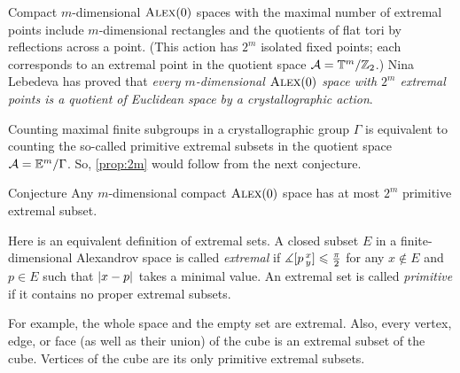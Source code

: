Compact $m$-dimensional $\textsc{Alex}(0)$ spaces with the maximal number of extremal points include $m$-dimensional rectangles and the quotients of flat tori by reflections across a point.
(This action has $2^m$ isolated fixed points; each corresponds to an extremal point in the quotient space $\mathcal{A}=\mathbb{T}^m/\mathbb{Z}_2$.)
Nina Lebedeva has proved \cite{lebedeva} that \textit{every $m$-dimensional $\textsc{Alex}(0)$ space with $2^m$ extremal points is a quotient of Euclidean space by a crystallographic action}.

Counting maximal finite subgroups in a crystallographic group $\Gamma$ is equivalent to counting the so-called primitive extremal subsets in the quotient space $\mathcal{A}=\mathbb{E}^m/\Gamma$.
So, \ref{prop:2m} would follow from the next conjecture.

\begin{thm}{Conjecture}
Any $m$-dimensional compact $\textsc{Alex}(0)$ space has at most $2^m$ primitive extremal subset.
\end{thm}

Here is an equivalent definition of extremal sets.  
A closed subset $E$ in a finite-dimensional Alexandrov space is called 
\emph{extremal} if $\measuredangle[p\,{}^{x}_{y}]\leqslant \tfrac\pi2$ for any $x\notin E$ and $p\in E$ such that $|{x}-{p}|_{}^{{}}$ takes a minimal value.
An extremal set is called \emph{primitive} if it contains no proper extremal subsets.

For example, the whole space and the empty set are extremal.
Also, every vertex, edge, or face (as well as their union) of the cube is an extremal subset of the cube.
Vertices of the cube are its only primitive extremal subsets.

